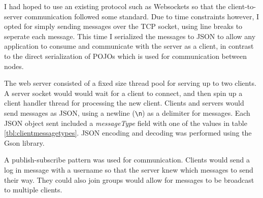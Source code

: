 \documentclass[12pt]{article}
\begin{document}
I had hoped to use an existing protocol such as Websockets so that the client-to-server communication followed some standard. Due to time constraints however, I opted for simply sending messages over the TCP socket, using line breaks to seperate each message. This time I serialized the messages to JSON to allow any application to consume and communicate with the server as a client, in contrast to the direct serialization of POJOs which is used for communication between nodes.

The web server consisted of a fixed size thread pool for serving up to two clients. A server socket would would wait for a client to connect, and then spin up a client handler thread for processing the new client. Clients and servers would send messages as JSON, using a newline (\lstinline{\n}) as a delimiter for messages. Each JSON object sent included a \emph{messageType} field with one of the values in table \ref{tbl:clientmessagetypes}. JSON encoding and decoding was performed using the Gson library. 

A publish-subscribe pattern was used for communication. Clients would send a log in message with a username so that the server knew which messages to send their way. They could also join groups would allow for messages to be broadcast to multiple clients. 

\begin{table}[!h]
\centering
{}
\caption{Messages sent between client and server.}
\label{tbl:clientmessagetypes}
\end{table}
\end{document}
